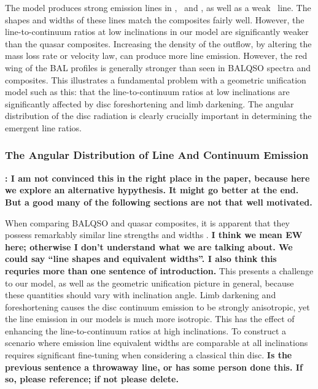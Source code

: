 \documentclass[preprint, a4paper, 11pt]{aastex}
\begin{document}
The model produces strong emission lines in \civ, \nv\ and \la,
as well as a weak \mg\ line. The shapes and widths of these lines
match the composites fairly well. However, the line-to-continuum ratios 
at low inclinations in our model are significantly weaker than the quasar 
composites. Increasing the density of the outflow, by altering the mass 
loss rate  or velocity law, can produce more line emission.
However, the red wing of the BAL profiles is generally stronger than 
seen in BALQSO spectra and composites. This illustrates a fundamental 
problem with a geometric unification model such as this:
that the line-to-continuum ratios at low inclinations are
significantly affected by disc foreshortening and limb darkening.
The angular distribution of the disc radiation is clearly
crucially important in determining the emergent line ratios.

\subsubsection{The Angular Distribution of Line And Continuum Emission}
\label{discsed}

{\bf: I am not convinced this in the right place in the paper, because here we explore an alternative hypythesis.  It might go better at the end.  But a good many of the following sections are not that well motivated.}


When comparing BALQSO and quasar composites, it is apparent
that they possess remarkably similar line strengths and widths 
\citep[e.g.][]{weymann1991,reichard2003}.  
{\bf I think we mean EW here; otherwise I don't understand what we are talking about.  We could say ``line shapes and equivalent widths''.  I also think this requries more than one sentence of introduction.}
This presents a challenge to our model, as well as the geometric 
unification picture in general, because these quantities should vary with inclination angle.
Limb darkening and foreshortening causes the disc continuum emission to be 
strongly anisotropic, yet the line emission in our models is much more isotropic. 
This has the effect of enhancing the line-to-continuum ratios at high inclinations. 
To construct a scenario where emission 
line equivalent widths are comparable at all inclinations requires 
significant fine-tuning when considering a classical thin disc. {\bf Is the previous sentence a throwaway line, or has some person done this.  If so, please reference; if not please delete.}
\end{document}
